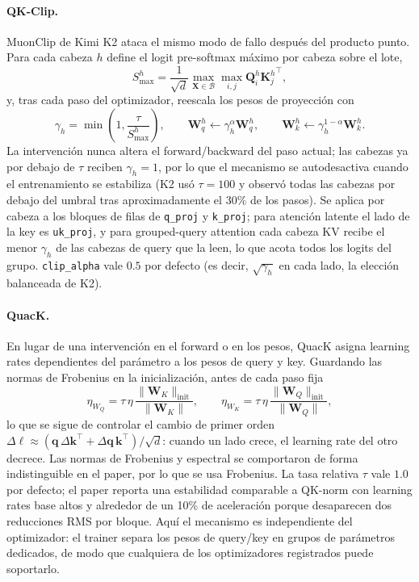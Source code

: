 \paragraph{QK-Clip.}
MuonClip de Kimi K2 \citep{kimi2025k2} ataca el mismo modo de fallo después del producto punto. Para cada cabeza $h$ define el logit pre-softmax máximo por cabeza sobre el lote,
\[
S^h_{\max}=\frac{1}{\sqrt{d}}\max_{\mathbf{X}\in\mathcal{B}}\max_{i,j}\mathbf{Q}^h_i{\mathbf{K}^h_j}^\top,
\]
y, tras cada paso del optimizador, reescala los pesos de proyección con
\[
\gamma_h=\min\!\left(1,\frac{\tau}{S^h_{\max}}\right),\qquad
\mathbf{W}^h_q\leftarrow\gamma_h^{\alpha}\mathbf{W}^h_q,\qquad
\mathbf{W}^h_k\leftarrow\gamma_h^{1-\alpha}\mathbf{W}^h_k .
\]
La intervención nunca altera el forward/backward del paso actual; las cabezas ya por debajo de $\tau$ reciben $\gamma_h=1$, por lo que el mecanismo se autodesactiva cuando el entrenamiento se estabiliza (K2 usó $\tau=100$ y observó todas las cabezas por debajo del umbral tras aproximadamente el 30\% de los pasos). Se aplica por cabeza a los bloques de filas de \texttt{q\_proj} y \texttt{k\_proj}; para atención latente el lado de la key es \texttt{uk\_proj}, y para grouped-query attention cada cabeza KV recibe el menor $\gamma_h$ de las cabezas de query que la leen, lo que acota todos los logits del grupo. \texttt{clip\_alpha} vale $0.5$ por defecto (es decir, $\sqrt{\gamma_h}$ en cada lado, la elección balanceada de K2).

\paragraph{QuacK.}
En lugar de una intervención en el forward o en los pesos, QuacK \citep{anson2025controlling} asigna learning rates dependientes del parámetro a los pesos de query y key. Guardando las normas de Frobenius en la inicialización, antes de cada paso fija
\[
\eta_{W_Q}=\tau\,\eta\,\frac{\|\mathbf{W}_K\|_{\mathrm{init}}}{\|\mathbf{W}_K\|},\qquad
\eta_{W_K}=\tau\,\eta\,\frac{\|\mathbf{W}_Q\|_{\mathrm{init}}}{\|\mathbf{W}_Q\|},
\]
lo que se sigue de controlar el cambio de primer orden $\Delta\ell\approx(\mathbf{q}\,\Delta\mathbf{k}^\top+\Delta\mathbf{q}\,\mathbf{k}^\top)/\sqrt{d}$: cuando un lado crece, el learning rate del otro decrece. Las normas de Frobenius y espectral se comportaron de forma indistinguible en el paper, por lo que se usa Frobenius. La tasa relativa $\tau$ vale $1.0$ por defecto; el paper reporta una estabilidad comparable a QK-norm con learning rates base altos y alrededor de un 10\% de aceleración porque desaparecen dos reducciones RMS por bloque. Aquí el mecanismo es independiente del optimizador: el trainer separa los pesos de query/key en grupos de parámetros dedicados, de modo que cualquiera de los optimizadores registrados puede soportarlo.

